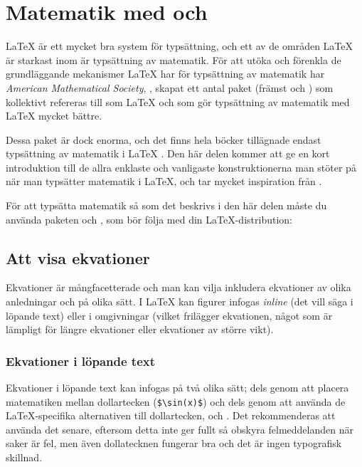 \documentclass[10pt,../../a4.tex]{subfiles}
\begin{document}
\chapter{Matematik med  och \texorpdfstring{\AmS}{AMS}}\label{sec:3}
\LaTeX{} är ett mycket bra system för typsättning, och ett av de områden
\LaTeX{} är starkast inom är typsättning av matematik. För att utöka och
förenkla de grundläggande mekanismer \LaTeX{} har för typsättning av 
matematik har \textit{American Mathematical Society}, \AmS, skapat ett 
antal paket (främst  och ) som kollektivt 
refereras till som \AmS\LaTeX{} och som gör typsättning av matematik med 
\LaTeX{} mycket bättre.

Dessa paket är dock enorma, och det finns hela böcker tillägnade endast
typsättning av matematik i \LaTeX{} \parencite[till exempel][som för övrigt är en 
mycket bra referens att ha till hands när man typsätter matematik i 
\LaTeX]{Voss10}.
Den här delen kommer att ge en kort introduktion till de allra enklaste
och vanligaste konstruktionerna man stöter på när man typsätter matematik
i \LaTeX, och tar mycket inspiration från \textcite{Voss10}.

För att typsätta matematik så som det beskrivs i den här delen måste du
använda paketen  och , som bör följa med din
\LaTeX-distribution:
\begin{latexcode}
\usepackage{amsmath}
\usepackage{amssymb}
\end{latexcode}

\section{Att visa ekvationer}
Ekvationer är mångfacetterade och man kan vilja inkludera ekvationer av
olika anledningar och på olika sätt. I \LaTeX{} kan figurer infogas
\emph{inline} (det vill säga i löpande text) eller i omgivningar (vilket
frilägger ekvationen, något som är lämpligt för längre ekvationer eller
ekvationer av större vikt).

\subsection{Ekvationer i löpande text}
Ekvationer i löpande text kan infogas på två olika sätt; dels genom att
placera matematiken mellan dollartecken (\verb|$\sin(x)$|) och dels genom
att använda de \LaTeX-specifika alternativen till dollartecken, \cmd{(}
och \cmd{)}. Det rekommenderas att använda det senare, eftersom detta inte
ger fullt så obskyra felmeddelanden när saker är fel, men även
dollatecknen fungerar bra och det är ingen typografisk skillnad.
\end{document}

